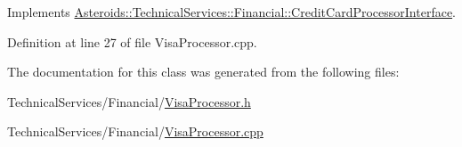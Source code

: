 Implements \hyperlink{classAsteroids_1_1TechnicalServices_1_1Financial_1_1CreditCardProcessorInterface_a8dcf97d20a9de55d04e0f84b4a788f78}{Asteroids\+::\+Technical\+Services\+::\+Financial\+::\+Credit\+Card\+Processor\+Interface}.



Definition at line 27 of file Visa\+Processor.\+cpp.



The documentation for this class was generated from the following files\+:\begin{DoxyCompactItemize}
\item 
Technical\+Services/\+Financial/\hyperlink{VisaProcessor_8h}{Visa\+Processor.\+h}\item 
Technical\+Services/\+Financial/\hyperlink{VisaProcessor_8cpp}{Visa\+Processor.\+cpp}\end{DoxyCompactItemize}
